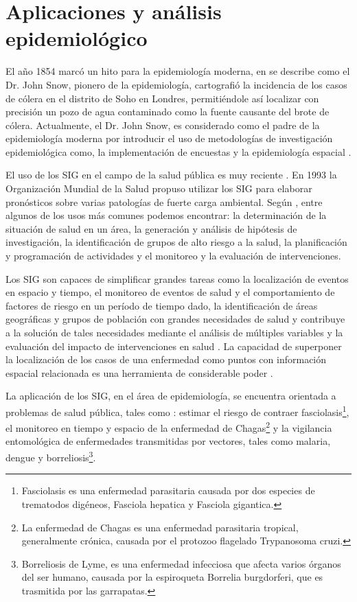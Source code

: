 \section{Aplicaciones y análisis epidemiológico}
\label{sec:cap2-aplicaciones-analisis-epidemiologico}

El año 1854 marcó un hito para la epidemiología moderna, en \cite{jCerdaJohnSnow2007} se describe
como el Dr. John Snow, pionero de la epidemiología, cartografió la incidencia de los casos de
cólera en el distrito de Soho en Londres, permitiéndole así localizar con precisión un pozo de
agua contaminado como la fuente causante del brote de cólera. Actualmente, el Dr. John Snow, es
considerado como el padre de la epidemiología moderna por introducir el uso de  metodologías de
investigación epidemiológica como, la implementación de encuestas y la epidemiología espacial
\cite{jCerdaJohnSnow2007}.

El uso de los SIG en el campo de la salud pública es muy reciente \cite{martinez2001sigepi}. En
1993 la Organización Mundial de la Salud propuso utilizar los SIG para elaborar pronósticos
sobre varias patologías de fuerte carga ambiental\cite{curto2003aplicacion}. Según
\cite{martinez2001sigepi}, entre algunos de los usos más comunes podemos encontrar: la
determinación de la situación de salud en un área, la generación y análisis de hipótesis de
investigación, la identificación de grupos de alto riesgo a la salud, la planificación y
programación de actividades y el monitoreo y la evaluación de intervenciones.

Los SIG son capaces de simplificar grandes tareas como la localización de eventos en espacio y
tiempo, el monitoreo de eventos de salud y el comportamiento de factores de riesgo en un período
de tiempo dado, la identificación de áreas geográficas y grupos de población con grandes
necesidades de salud y contribuye a la solución de tales necesidades mediante el análisis de
múltiples variables y la evaluación del impacto de intervenciones en salud
\cite{martinez2001sigepi, iMolinaSigEpidemiologia}. La capacidad de superponer la localización de
los casos de una enfermedad como puntos con información espacial relacionada es una herramienta de
considerable poder \cite{iMolinaSigEpidemiologia}.

La aplicación de los SIG, en el área de epidemiología, se encuentra orientada a problemas de salud
pública, tales como : estimar el riesgo de contraer fasciolasis\footnote{Fasciolasis es una
enfermedad parasitaria causada por dos especies de trematodos digéneos, Fasciola hepatica y
Fasciola gigantica.}\cite{zukowski1993fasciolosis}, el monitoreo en tiempo y espacio de la
enfermedad de Chagas\footnote{La enfermedad de Chagas es una enfermedad parasitaria tropical,
generalmente crónica, causada por el protozoo flagelado Trypanosoma cruzi.}\cite{rogers1993monitoring} y la vigilancia entomológica de enfermedades transmitidas por vectores,
tales como malaria, dengue y borreliosis\footnote{Borreliosis de Lyme, es una enfermedad
infecciosa que afecta varios órganos del ser humano, causada por la espiroqueta Borrelia
burgdorferi, que es trasmitida por las garrapatas.}\cite{su1994framework, nino2008uso, albierispatial, beck1994remote, kitron1994geographic}.

